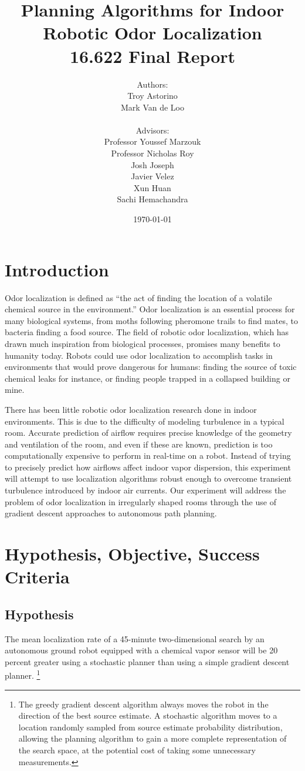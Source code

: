 \documentclass[submit, 12pt]{aiaa-pretty-modified}
\title{\textbf{Planning Algorithms for Indoor Robotic Odor
    Localization}\\
{16.622 Final Report}}
\date{\today}
\author{Authors: \\Troy Astorino \\ Mark Van de Loo \\
  \\ 
  Advisors:\\ Professor Youssef Marzouk \\ Professor Nicholas
    Roy \\ Josh Joseph \\ Javier Velez \\ Xun Huan \\ Sachi Hemachandra}
\begin{document}
\maketitle

\newpage

\tableofcontents

\newpage

\listoffigures

\newpage

\listoftables

\newpage

\section{Introduction}

Odor localization is defined as ``the act of finding the location of a
volatile chemical source in the environment.''\cite{kowadlo} Odor
localization is an essential process for many biological systems, from
moths following pheromone trails to find mates, to bacteria finding a
food source. The field of robotic odor localization, which has drawn
much inspiration from biological processes, promises many benefits to
humanity today. Robots could use odor localization to accomplish tasks
in environments that would prove dangerous for humans: finding the
source of toxic chemical leaks for instance, or finding people
trapped in a collapsed building or mine.

There has been little robotic odor localization research done in indoor
environments. This is due to the difficulty of modeling turbulence in a typical
room. Accurate prediction of airflow requires precise knowledge of the geometry
and ventilation of the room, and even if these are known, prediction is too
computationally expensive to perform in real-time on a robot. Instead of trying
to precisely predict how airflows affect indoor vapor dispersion, this
experiment will attempt to use localization algorithms robust enough to overcome
transient turbulence introduced by indoor air currents. Our experiment will
address the problem of odor localization in irregularly shaped rooms through the
use of gradient descent approaches to autonomous path planning.

\section{Hypothesis, Objective, Success Criteria}
\label{sec:hos}
\subsection*{Hypothesis} 
The mean localization rate of a 45-minute two-dimensional search by an
autonomous ground robot equipped with a chemical vapor sensor will be 20 percent
greater using a stochastic planner than using a simple gradient descent planner.
\footnote{ The greedy gradient descent algorithm always moves the robot in the
  direction of the best source estimate. A stochastic algorithm moves to a
  location randomly sampled from source estimate probability distribution,
  allowing the planning algorithm to gain a more complete representation of the
  search space, at the potential cost of taking some unnecessary measurements.}
\end{document}
